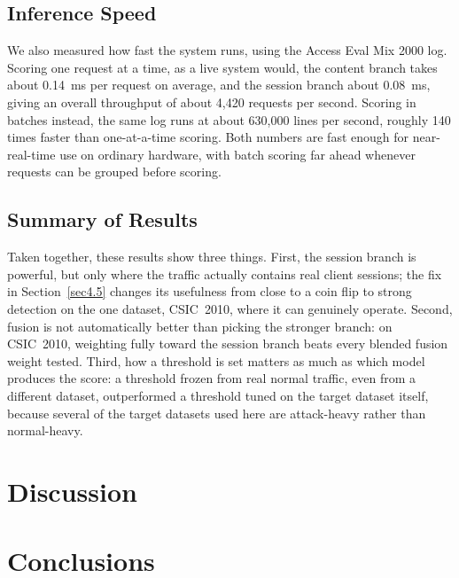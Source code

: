 \documentclass[futureinternet,article,accept,moreauthors]{Definitions/mdpi}
\begin{document}
\subsection{Inference Speed}

We also measured how fast the system runs, using the Access Eval Mix 2000 log. Scoring one request at a time, as a live system would, the content branch takes about 0.14~ms per request on average, and the session branch about 0.08~ms, giving an overall throughput of about 4{,}420 requests per second. Scoring in batches instead, the same log runs at about 630{,}000 lines per second, roughly 140 times faster than one-at-a-time scoring. Both numbers are fast enough for near-real-time use on ordinary hardware, with batch scoring far ahead whenever requests can be grouped before scoring.

\subsection{Summary of Results}

Taken together, these results show three things. First, the session branch is powerful, but only where the traffic actually contains real client sessions; the fix in Section~\ref{sec4.5} changes its usefulness from close to a coin flip to strong detection on the one dataset, CSIC~2010, where it can genuinely operate. Second, fusion is not automatically better than picking the stronger branch: on CSIC~2010, weighting fully toward the session branch beats every blended fusion weight tested. Third, how a threshold is set matters as much as which model produces the score: a threshold frozen from real normal traffic, even from a different dataset, outperformed a threshold tuned on the target dataset itself, because several of the target datasets used here are attack-heavy rather than normal-heavy.

\section{Discussion} \label{sec6}

\section{Conclusions} \label{sec7}
\end{document}
